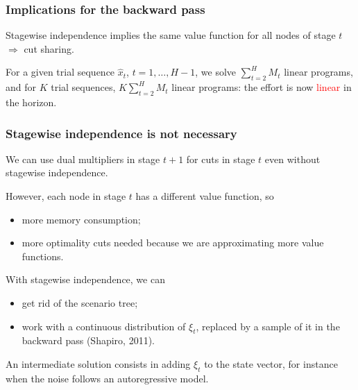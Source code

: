 \documentclass[aspectratio=169]{beamer}
\newcommand{\recombgraph}[2]{%
  \node[nd] (r) at (0,0) {$1$};
  \node[#1] (a1) at (2,1.1)  {$1$};
  \node[#1] (a2) at (2,-1.1) {$2$};
  \node[#2] (b1) at (4,1.65)  {$1$};
  \node[#2] (b2) at (4,0.55)  {$2$};
  \node[#2] (b3) at (4,-0.55) {$3$};
  \node[#2] (b4) at (4,-1.65) {$4$};
  \draw[edg] (r) -- (a1) (r) -- (a2);
  \foreach \a in {a1,a2} \foreach \b in {b1,b2,b3,b4} \draw[edg] (\a) -- (\b);}
\begin{document}
\begin{frame}
\frametitle{Implications for the backward pass}

Stagewise independence implies the same value function for all nodes
of stage $t$ $\Longrightarrow$ cut sharing.

\begin{center}
\end{center}

For a given trial sequence $\hat{x}_{t}$, $t = 1,\ldots,H-1$, we solve
$\sum_{t=2}^{H} M_t$ linear programs, and for $K$ trial sequences,
$K\sum_{t=2}^{H} M_t$ linear programs: the effort is now
\textcolor{red}{linear} in the horizon.

\end{frame}

\begin{frame}
\frametitle{Stagewise independence is not necessary}

We can use dual multipliers in stage $t + 1$ for cuts in stage $t$
even without stagewise independence.

\mbox{}

However, each node in stage $t$ has a different value function, so
\begin{itemize}
	\item
more memory consumption;
	\item
more optimality cuts needed because we are
approximating more value functions.
\end{itemize}
With stagewise independence, we can
\begin{itemize}
	\item
get rid of the scenario tree;
	\item
work with a continuous distribution of $\xi_t$, replaced by a sample of it in the backward pass
(Shapiro, 2011).
\end{itemize}
An intermediate solution consists in adding $\xi_{t}$ to the state vector, for instance
when the noise follows an autoregressive model.

\end{frame}
\end{document}
